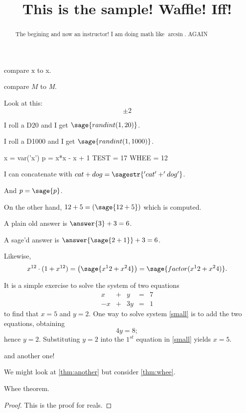 \documentclass{ximera}
\title[Breal-grond]{This is the sample! Waffle!  Iff!}
\makeatletter
\newcommand{\makerandom}{}
\newcommand{\makerandom}{%
  \ST@wsf{jobname="\currfilebase"}%
  \ST@wsf{import hashlib}%
  \ST@wsf{set_random_seed(int(hashlib.sha256(jobname.encode('utf-8')).hexdigest(), 16))}%
}
\makeatother
\begin{document}
\begin{abstract}
  The begining and now an instructor! I am doing math like $\arcsin$. AGAIN
\end{abstract}

\maketitle
\makerandom

compare $\mathrm{x}$ to x.

compare $M$ to \textit{M}.

Look at this:
\[
  \pm 2
\]

I roll a D20 and I get $\sage{randint(1,20)}$.

I roll a D1000 and I get $\sage{randint(1,1000)}$.


\begin{sagesilent}
  x = var('x')
  p = x*x - x + 1
  TEST = 17
  WHEE = 12
\end{sagesilent}

I can concatenate with $cat + dog = \sagestr{'cat' + 'dog'}$.

And $p = \sage{p}$.

On the other hand, $12 + 5 = \left( \sage{12+5} \right)$ which is computed.

\begin{problem}
  A plain old answer is $\answer{3} + 3 = 6$.

  A sage'd answer is $\answer{\sage{2+1}} + 3 = 6$.
\end{problem}

Likewise,
\[
  x^{12} \cdot (1 + x^{12}) = \left(\sage{x^12 + x^24}\right) = \sage{factor(x^12 + x^24)}.
\]

It is a simple exercise to solve the system of two equations
\begin{equation} \label{small}
\begin{array}{rcrcr}
 x & + & y & = & 7 \\
-x & + & 3y & = & 1
\end{array}
\end{equation}
to find that $x=5$ and $y=2$.  One way to solve
system \eqref{small} is to add the two equations, obtaining
\[
4y=8;
\]
hence $y=2$.  Substituting $y=2$ into the $1^{st}$ equation in
\ref{small} yields $x=5$.





and another one!



We might look at \ref{thm:another} but consider \ref{thm:whee}.

\begin{theorem}
  \label{thm:whee}  Whee theorem.
\end{theorem}
\begin{proof}
This is the proof for reals.
\end{proof}
\end{document}
